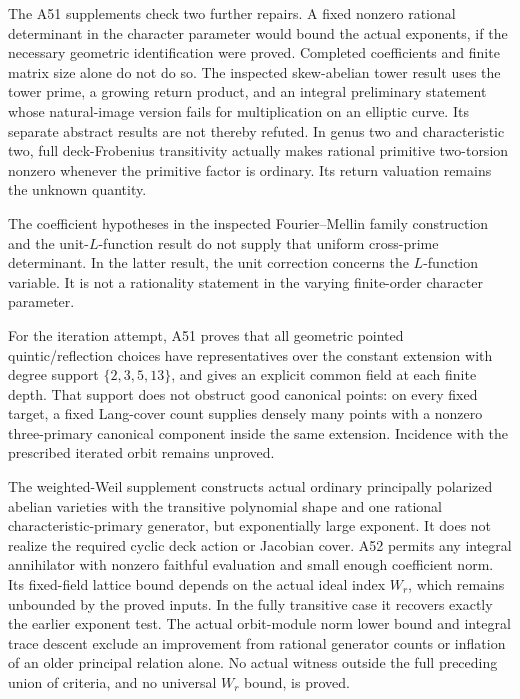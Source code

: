 The A51 supplements check two further repairs. A fixed nonzero
rational determinant in the character parameter would bound the actual
exponents, if the necessary geometric identification were proved.
Completed coefficients and finite matrix size alone do not do so.
The inspected skew-abelian tower result uses the tower prime, a growing
return product, and an integral preliminary statement whose natural-image
version fails for multiplication on an elliptic curve. Its separate
abstract results are not thereby refuted. In genus two and characteristic
two, full deck-Frobenius transitivity actually makes rational primitive
two-torsion nonzero whenever the primitive factor is ordinary. Its return
valuation remains the unknown quantity.

The coefficient hypotheses in the inspected Fourier--Mellin family
construction \cite[Theorems~1.3,1.5 and Definition~4.4]{EsnaultKerz2021}
and the unit-$L$-function result
\cite[Corollary~1.8]{EmertonKisin2001} do not supply that uniform
cross-prime determinant. In the latter result, the unit correction concerns
the $L$-function variable. It is not a rationality statement in the
varying finite-order character parameter.

For the iteration attempt, A51 proves that all geometric pointed
quintic/reflection choices have representatives over the constant extension
with degree support $\{2,3,5,13\}$, and gives an explicit common field at
each finite depth. That support does not obstruct good canonical points:
on every fixed target, a fixed Lang-cover count supplies densely many
points with a nonzero three-primary canonical component inside the same
extension. Incidence with the prescribed iterated orbit remains unproved.

The weighted-Weil supplement constructs actual ordinary principally
polarized abelian varieties with the transitive polynomial shape and one
rational characteristic-primary generator, but exponentially large exponent.
It does not realize the required cyclic deck action or Jacobian cover.
A52 permits any integral annihilator with nonzero faithful evaluation and
small enough coefficient norm. Its fixed-field lattice bound depends on
the actual ideal index $W_r$, which remains unbounded by the proved inputs.
In the fully transitive case it recovers exactly the earlier exponent test.
The actual orbit-module norm lower bound and integral trace descent exclude
an improvement from rational generator counts or inflation of an older
principal relation alone. No actual witness outside the full preceding
union of criteria, and no universal $W_r$ bound, is proved.

